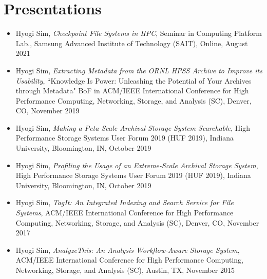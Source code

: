 \section{Presentations}

\begin{itemize}
\item {Hyogi Sim, \emph{Checkpoint File Systems in HPC},
       Seminar in Computing Platform Lab., Samsung Advanced Institute of Technology (SAIT), Online, August 2021}
\item {Hyogi Sim, \emph{Extracting Metadata from the ORNL HPSS Archive to
       Improve its Usability},
       ``{Knowledge Is Power: Unleashing the Potential of Your Archives
       through Metadata}" BoF in ACM/IEEE International Conference for
       High Performance Computing, Networking, Storage, and Analysis (SC), Denver, CO, November 2019}
\item {Hyogi Sim, \emph{Making a Peta-Scale Archival Storage System Searchable},
       High Performance Storage Systems User Forum 2019 (HUF 2019),
       Indiana University, Bloomington, IN, October 2019}
\item {Hyogi Sim, \emph{Profiling the Usage of an Extreme-Scale Archival Storage System},
       High Performance Storage Systems User Forum 2019 (HUF 2019),
       Indiana University, Bloomington, IN, October 2019}
\item {Hyogi Sim, \emph{TagIt: An Integrated Indexing and Search Service for File Systems},
       ACM/IEEE International Conference for
       High Performance Computing, Networking, Storage, and Analysis (SC), Denver, CO, November 2017}
\item {Hyogi Sim, \emph{AnalyzeThis: An Analysis Workflow-Aware Storage System},
       ACM/IEEE International Conference for
       High Performance Computing, Networking, Storage, and Analysis (SC), Austin, TX, November 2015}
\end{itemize}
